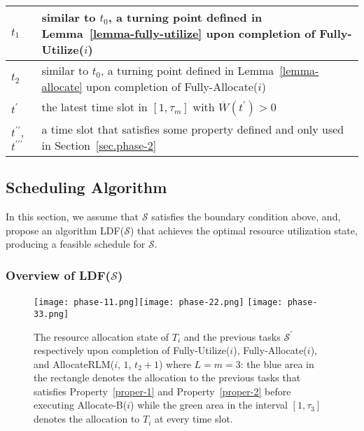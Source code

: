 \documentclass[10pt,journal,compsoc]{IEEEtran}
\begin{document}
\begin{table}
\begin{threeparttable}[!ht]
\begin{tabular}{|C{1.2cm}|C{6.2cm}|}
$t_{1}$ & similar to $t_{0}$, a turning point defined in Lemma~\ref{lemma-fully-utilize} upon completion of Fully-Utilize($i$)  \\ \hline

$t_{2}$ & similar to $t_{0}$, a turning point defined in Lemma~\ref{lemma-allocate} upon completion of Fully-Allocate($i$)  \\ \hline

$t^{\prime}$ & the latest time slot in $[1, \tau_{m}]$ with $\overline{W}(t^{\prime})>0$  \\ \hline


$t^{\prime\prime}$, $t^{\prime\prime\prime}$ & a time slot that satisfies some property defined and only used in Section~\ref{sec.phase-2}  \\ \hline

\end{tabular}
\label{table-2}
 \end{threeparttable}
\end{table}









\subsection{Scheduling Algorithm}
\label{sec.scheduling}


In this section, we assume that $\mathcal{S}$ satisfies the boundary condition above, and, propose an algorithm LDF($\mathcal{S}$) that achieves the optimal resource utilization state, producing a feasible schedule for $\mathcal{S}$.

\subsubsection{Overview of LDF($\mathcal{S}$)}
\label{sec.overview}






\begin{figure*}\centering
  \texttt{[image: phase-11.png]}\texttt{[image: phase-22.png]}
  \texttt{[image: phase-33.png]}

  \caption{The resource allocation state of $T_{i}$ and the previous tasks $\mathcal{S}^{\prime}$ respectively upon completion of Fully-Utilize($i$), Fully-Allocate($i$), and AllocateRLM($i$, $1$, $t_{2}+1$) where $L=m=3$: the blue area in the rectangle denotes the allocation to the previous tasks that satisfies Property~\ref{proper-1} and Property~\ref{proper-2} before executing Allocate-B($i$) while the green area in the interval $[1, \tau_{3}]$ denotes the allocation to $T_{i}$ at every time slot.}\label{Fig.5}
\end{figure*}
\end{document}
